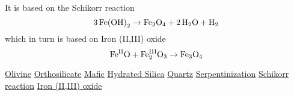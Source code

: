 \documentclass[a4paper,14pt]{extarticle}
\def\H{{\rm H}}
\def\O{{\rm O}}
\def\Fe{{\rm Fe}}
\def\II{{\rm II}}
\def\III{{\rm III}}
\begin{document}
It is based on the Schikorr reaction\cite{schikorr_reaction}
\[
    3\, \Fe{(\O\H)}_2 \rightarrow \Fe_3\O_4 + 2\,\H_2\O + \H_2
\]
which in turn is based on Iron (II,III) oxide\cite{iron_ii_iii_oxide}
\[
    \Fe^{\II}\O + \Fe_2^{\III}\O_3 \rightarrow \Fe_3\O_4
\]





\begin{thebibliography}{9}
               \href{https://en.wikipedia.org/wiki/Olivine}{Olivine}
         \href{https://en.wikipedia.org/wiki/Orthosilicate}{Orthosilicate}
                 \href{https://en.wikipedia.org/wiki/Mafic}{Mafic}
       \href{https://en.wikipedia.org/wiki/Hydrated_silica}{Hydrated Silica}
                \href{https://en.wikipedia.org/wiki/Quartz}{Quartz}
      \href{https://en.wikipedia.org/wiki/Serpentinization}{Serpentinization}
     \href{https://en.wikipedia.org/wiki/Schikorr_reaction}{Schikorr reaction}
     \href{https://en.wikipedia.org/wiki/Iron(II,III)_oxide}{Iron (II,III) oxide}
\end{thebibliography}
\end{document}
